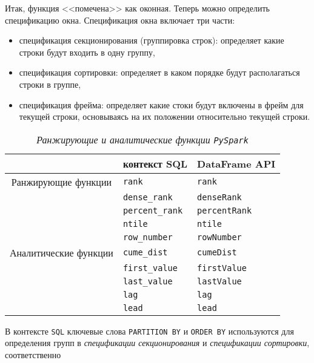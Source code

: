 \documentclass[%
	11pt,
	a4paper,
	utf8,
		]{article}
\begin{document}
Итак, функция <<помечена>> как оконная. Теперь можно определить спецификацию окна. Спецификация окна включает три части:

\begin{itemize}
	\item спецификация секционирования (группировка строк): определяет какие строки будут входить в одну группу,
	
	\item спецификация сортировки: определяет в каком порядке будут располагаться строки в группе,
	
	\item спецификация фрейма: определяет какие стоки будут включены в фрейм для текущей строки, основываясь на их положении относительно текущей строки.
\end{itemize}

\begin{table}[h]
	\centering
	\caption{\itshape Ранжирующие и аналитические функции \texttt{PySpark}}\label{tab:sql_df_api}
	\begin{tabular}{cll}
		{} & контекст {SQL} & {DataFrame API} \\ \hline\hline
		Ранжирующие функции & \texttt{rank} & \texttt{rank} \\
		\rowcolor[gray]{0.96} {} & \texttt{dense\_rank} & \texttt{denseRank} \\
		{} & \texttt{percent\_rank} & \texttt{percentRank} \\
		\rowcolor[gray]{0.96} {} & \texttt{ntile} & \texttt{ntile} \\
		{} & \texttt{row\_number} & \texttt{rowNumber} \\ \hline
		\rowcolor[gray]{0.96} Аналитические функции & \texttt{cume\_dist} & \texttt{cumeDist} \\
		{} & \texttt{first\_value} & \texttt{firstValue} \\
		\rowcolor[gray]{0.96}{} & \texttt{last\_value} & \texttt{lastValue} \\
		{} & \texttt{lag} & \texttt{lag} \\
		\rowcolor[gray]{0.96} {} & \texttt{lead} & \texttt{lead} \\
	\end{tabular}
\end{table}

В контексте \texttt{SQL} ключевые слова \texttt{PARTITION BY} и \texttt{ORDER BY} используются для определения групп в \emph{спецификации секционирования} и \emph{спецификации сортировки}, соответственно
\end{document}
